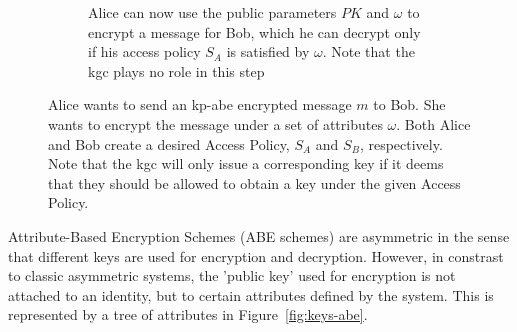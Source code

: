 \begin{figure}
\begin{subfigure}[c]{0.6\textwidth}
        \caption{Alice can now use the public parameters $PK$ and $\omega$ to encrypt a message for Bob, which he can decrypt only if his access policy $S_A$ is satisfied by $\omega$. Note that the \acrshort{kgc} plays no role in this step}
    \end{subfigure}
    \caption[Interaction of Alice, Bob and KGC in an \acrshort{abes}]{
        Alice wants to send an \acrshort{kp-abe} encrypted message $m$ to Bob. She wants to encrypt the message under a set of attributes $\omega$.
        Both Alice and Bob create a desired Access Policy, $S_A$ and $S_B$, respectively.
        Note that the \acrshort{kgc} will only issue a corresponding key if it deems that they should be allowed to obtain a key under the given Access Policy.
    }
\end{figure}

Attribute-Based Encryption Schemes (ABE schemes) are asymmetric in the sense that different keys are used for encryption and decryption.
However, in constrast to classic asymmetric systems, the 'public key' used for encryption is not attached to an identity, but to certain attributes defined by the system.
This is represented by a tree of attributes in Figure~\ref{fig:keys-abe}.


